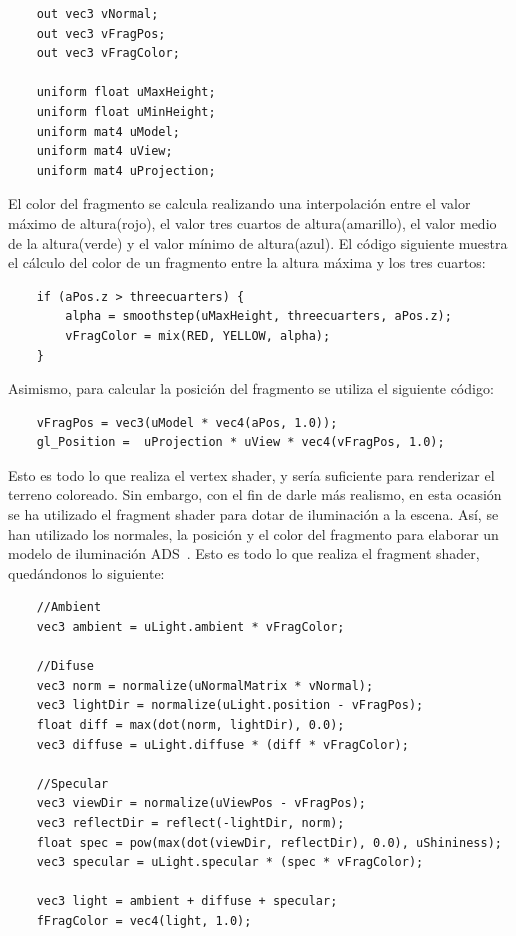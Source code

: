 \begin{verbatim}
    out vec3 vNormal;
    out vec3 vFragPos;
    out vec3 vFragColor;
    
    uniform float uMaxHeight;
    uniform float uMinHeight;
    uniform mat4 uModel;
    uniform mat4 uView;
    uniform mat4 uProjection;
\end{verbatim}

El color del fragmento se calcula realizando una interpolación entre el valor
máximo de altura(rojo), el valor tres cuartos de altura(amarillo), el valor
medio de la altura(verde) y el valor mínimo de altura(azul). El código siguiente
muestra el cálculo del color de un fragmento entre la altura máxima y los tres
cuartos:

\begin{verbatim}
    if (aPos.z > threecuarters) {
        alpha = smoothstep(uMaxHeight, threecuarters, aPos.z);	
        vFragColor = mix(RED, YELLOW, alpha);	
    }
\end{verbatim}

Asimismo, para calcular la posición del fragmento se utiliza el siguiente
código:

\begin{verbatim}		
    vFragPos = vec3(uModel * vec4(aPos, 1.0)); 
    gl_Position =  uProjection * uView * vec4(vFragPos, 1.0);
\end{verbatim}

Esto es todo lo que realiza el vertex shader, y sería suficiente para renderizar
el terreno coloreado. Sin embargo, con el fin de darle más realismo, en esta
ocasión se ha utilizado el fragment shader para dotar de iluminación a la
escena. Así, se han utilizado los normales, la posición y el color del fragmento
para elaborar un modelo de iluminación ADS~\cite{Bailey}. Esto es todo lo que
realiza el fragment shader, quedándonos lo siguiente:

\begin{verbatim}
    //Ambient
    vec3 ambient = uLight.ambient * vFragColor; 
    
    //Difuse
    vec3 norm = normalize(uNormalMatrix * vNormal);
    vec3 lightDir = normalize(uLight.position - vFragPos);
    float diff = max(dot(norm, lightDir), 0.0);
    vec3 diffuse = uLight.diffuse * (diff * vFragColor); 
    
    //Specular
    vec3 viewDir = normalize(uViewPos - vFragPos);
    vec3 reflectDir = reflect(-lightDir, norm); 
    float spec = pow(max(dot(viewDir, reflectDir), 0.0), uShininess);
    vec3 specular = uLight.specular * (spec * vFragColor);
    
    vec3 light = ambient + diffuse + specular;
    fFragColor = vec4(light, 1.0);
\end{verbatim}

